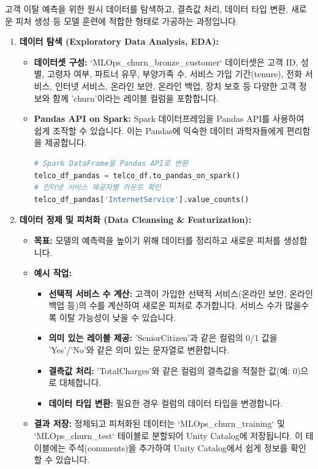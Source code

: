 \documentclass[11pt,a4paper]{article}
\begin{document}
\begin{summarybox}
고객 이탈 예측을 위한 원시 데이터를 탐색하고, 결측값 처리, 데이터 타입 변환, 새로운 피처 생성 등 모델 훈련에 적합한 형태로 가공하는 과정입니다.
\end{summarybox}

\begin{enumerate}
    \item \textbf{데이터 탐색 (Exploratory Data Analysis, EDA):}
    \begin{itemize}
        \item \textbf{데이터셋 구성:} `MLOps_churn_bronze_customer` 데이터셋은 고객 ID, 성별, 고령자 여부, 파트너 유무, 부양가족 수, 서비스 가입 기간(tenure), 전화 서비스, 인터넷 서비스, 온라인 보안, 온라인 백업, 장치 보호 등 다양한 고객 정보와 함께 'churn'이라는 레이블 컬럼을 포함합니다.
        \item \textbf{Pandas API on Spark:} Spark 데이터프레임을 Pandas API를 사용하여 쉽게 조작할 수 있습니다. 이는 Pandas에 익숙한 데이터 과학자들에게 편리함을 제공합니다.
        \begin{lstlisting}[language=Python, caption={Pandas API on Spark 예시}, label={lst:pandas_api_spark}]
# Spark DataFrame을 Pandas API로 변환
telco_df_pandas = telco_df.to_pandas_on_spark()
# 인터넷 서비스 제공자별 카운트 확인
telco_df_pandas['InternetService'].value_counts()
\end{lstlisting}
    \end{itemize}

    \item \textbf{데이터 정제 및 피처화 (Data Cleansing \& Featurization):}
    \begin{itemize}
        \item \textbf{목표:} 모델의 예측력을 높이기 위해 데이터를 정리하고 새로운 피처를 생성합니다.
        \item \textbf{예시 작업:}
        \begin{itemize}
            \item \textbf{선택적 서비스 수 계산:} 고객이 가입한 선택적 서비스(온라인 보안, 온라인 백업 등)의 수를 계산하여 새로운 피처로 추가합니다. 서비스 수가 많을수록 이탈 가능성이 낮을 수 있습니다.
            \item \textbf{의미 있는 레이블 제공:} 'SeniorCitizen'과 같은 컬럼의 0/1 값을 'Yes'/'No'와 같은 의미 있는 문자열로 변환합니다.
            \item \textbf{결측값 처리:} 'TotalCharges'와 같은 컬럼의 결측값을 적절한 값(예: 0)으로 대체합니다.
            \item \textbf{데이터 타입 변환:} 필요한 경우 컬럼의 데이터 타입을 변경합니다.
        \end{itemize}
        \item \textbf{결과 저장:} 정제되고 피처화된 데이터는 `MLOps_churn_training` 및 `MLOps_churn_test` 테이블로 분할되어 Unity Catalog에 저장됩니다. 이 테이블에는 주석(comments)을 추가하여 Unity Catalog에서 쉽게 정보를 확인할 수 있습니다.
    \end{itemize}
\end{enumerate}
\end{document}
